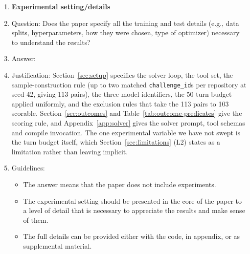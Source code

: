 \begin{enumerate}
\item {\bf Experimental setting/details}
    \item[] Question: Does the paper specify all the training and test details (e.g., data splits, hyperparameters, how they were chosen, type of optimizer) necessary to understand the results?
    \item[] Answer: \answerYes{}
    \item[] Justification: Section~\ref{sec:setup} specifies the solver loop, the tool set, the sample-construction rule (up to two matched \texttt{challenge\_id}s per repository at seed 42, giving 113 pairs), the three model identifiers, the 50-turn budget applied uniformly, and the exclusion rules that take the 113 pairs to 103 scorable. Section~\ref{sec:outcomes} and Table~\ref{tab:outcome-predicates} give the scoring rule, and Appendix~\ref{app:solver} gives the solver prompt, tool schemas and compile invocation. The one experimental variable we have not swept is the turn budget itself, which Section~\ref{sec:limitations} (L2) states as a limitation rather than leaving implicit.
    \item[] Guidelines:
    \begin{itemize}
        \item The answer \answerNA{} means that the paper does not include experiments.
        \item The experimental setting should be presented in the core of the paper to a level of detail that is necessary to appreciate the results and make sense of them.
        \item The full details can be provided either with the code, in appendix, or as supplemental material.
    \end{itemize}


\end{enumerate}
